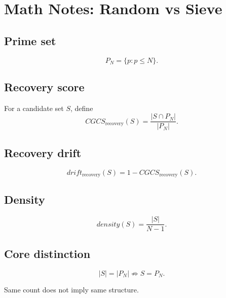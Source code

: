 \documentclass{article}
\begin{document}
\section*{Math Notes: Random vs Sieve}

\subsection*{Prime set}

\[
P_N = \{p : p \le N\}.
\]

\subsection*{Recovery score}

For a candidate set $S$, define
\[
CGCS_{\mathrm{recovery}}(S) =
\frac{|S \cap P_N|}{|P_N|}.
\]

\subsection*{Recovery drift}

\[
drift_{\mathrm{recovery}}(S) = 1 - CGCS_{\mathrm{recovery}}(S).
\]

\subsection*{Density}

\[
density(S) = \frac{|S|}{N-1}.
\]

\subsection*{Core distinction}

\[
|S| = |P_N| \nRightarrow S = P_N.
\]

Same count does not imply same structure.
\end{document}
